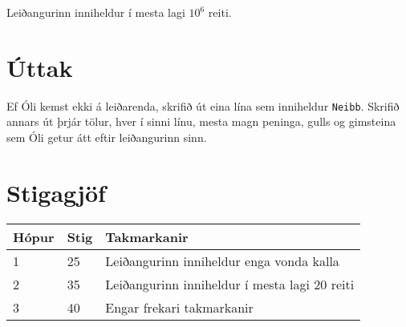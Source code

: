 Leiðangurinn inniheldur í mesta lagi $10^6$ reiti.

\section*{Úttak}
Ef Óli kemst ekki á leiðarenda, skrifið út eina lína sem inniheldur
\texttt{Neibb}. Skrifið annars út þrjár tölur, hver í sinni línu, mesta magn
peninga, gulls og gimsteina sem Óli getur átt eftir leiðangurinn sinn.

\section*{Stigagjöf}
\begin{tabular}{|l|l|l|}
\hline
Hópur & Stig & Takmarkanir \\ \hline
1     & 25   & Leiðangurinn inniheldur enga vonda kalla \\ \hline
2     & 35   & Leiðangurinn inniheldur í mesta lagi 20 reiti \\ \hline
3     & 40   & Engar frekari takmarkanir\\ \hline
\end{tabular}

